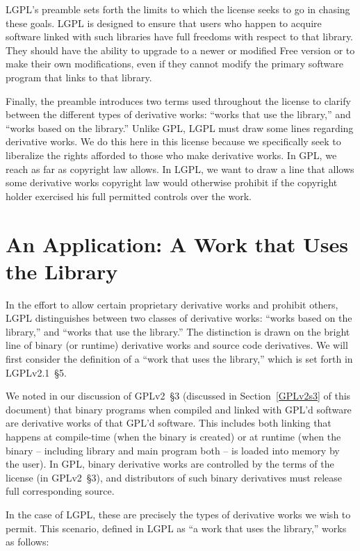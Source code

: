 LGPL's preamble sets forth the limits to which the license seeks to go in
chasing these goals. LGPL is designed to ensure that users who happen to
acquire software linked with such libraries have full freedoms with
respect to that library. They should have the ability to upgrade to a newer
or modified Free version or to make their own modifications, even if they
cannot modify the primary software program that links to that library.

Finally, the preamble introduces two terms used throughout the license to
clarify between the different types of derivative works: ``works that use
the library,'' and ``works based on the library.''  Unlike GPL, LGPL must
draw some lines regarding derivative works. We do this here in this
license because we specifically seek to liberalize the rights afforded to
those who make derivative works. In GPL, we reach as far as copyright law
allows. In LGPL, we want to draw a line that allows some derivative works
copyright law would otherwise prohibit if the copyright holder exercised
his full permitted controls over the work.

\section{An Application: A Work that Uses the Library}

In the effort to allow certain proprietary derivative works and prohibit
others, LGPL distinguishes between two classes of derivative works:
``works based on the library,'' and ``works that use the library.''  The
distinction is drawn on the bright line of binary (or runtime) derivative
works and source code derivatives. We will first consider the definition
of a ``work that uses the library,'' which is set forth in LGPLv2.1~\S5.

We noted in our discussion of GPLv2~\S3 (discussed in
Section~\ref{GPLv2s3} of this document) that binary programs when
compiled and linked with GPL'd software are derivative works of that GPL'd
software. This includes both linking that happens at compile-time (when
the binary is created) or at runtime (when the binary -- including library
and main program both -- is loaded into memory by the user). In GPL,
binary derivative works are controlled by the terms of the license (in GPLv2~\S3),
and distributors of such binary derivatives must release full
corresponding source\@.

In the case of LGPL, these are precisely the types of derivative works
we wish to permit. This scenario, defined in LGPL as ``a work that uses
the library,'' works as follows:

